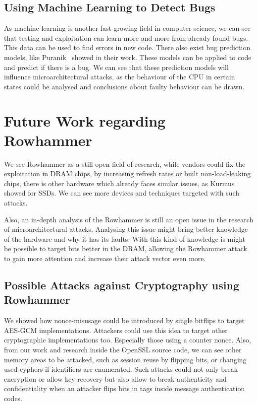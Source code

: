 \subsection{Using Machine Learning to Detect Bugs}

As machine learning is another fast-growing field in computer science, we can
see that testing and exploitation can learn more and more from already found
bugs. This data can be used to find errors in new code. There also exist bug
prediction models, like Puranik~\etal\cite{bugprediction} showed in their work.
These models can be applied to code and predict if there is a bug. We can see
that these prediction models will influence microarchitectural attacks, as the
behaviour of the CPU in certain states could be analysed and conclusions about
faulty behaviour can be drawn.

\section{Future Work regarding Rowhammer}

We see Rowhammer as a still open field of research, while vendors could fix the
exploitation in DRAM chips, by increasing refresh rates or built
non-load-leaking chips, there is other hardware which already faces similar
issues, as Kurmus~\etal\cite{rowssdhammer} showed for SSDs. We can see more
devices and techniques targeted with such attacks.

Also, an in-depth analysis of the Rowhammer is still an open issue in the
research of microarchitectural attacks. Analysing this issue might bring better
knowledge of the hardware and why it has its faults. With this kind of
knowledge is might be possible to target bits better in the DRAM, allowing the
Rowhammer attack to gain more attention and increase their attack vector even
more.

\subsection{Possible Attacks against Cryptography using Rowhammer}

We showed how nonce-misusage could be introduced by single bitflips to target
AES-GCM implementations. Attackers could use this idea to target other
cryptographic implementations too. Especially those using a counter nonce. Also,
from our work and research inside the OpenSSL source code, we can see other
memory areas to be attacked, such as session reuse by flipping bits, or changing
used cyphers if identifiers are enumerated. Such attacks could not only break
encryption or allow key-recovery but also allow to break authenticity and
confidentiality when an attacker flips bits in tags inside message
authentication codes.

